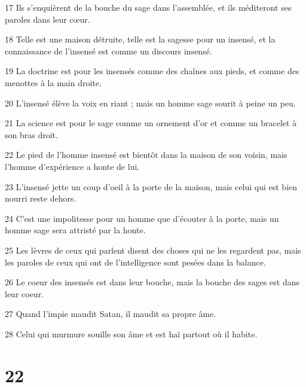 \par 17 Ils s'enquièrent de la bouche du sage dans l'assemblée, et ils méditeront ses paroles dans leur cœur.
\par 18 Telle est une maison détruite, telle est la sagesse pour un insensé, et la connaissance de l'insensé est comme un discours insensé.
\par 19 La doctrine est pour les insensés comme des chaînes aux pieds, et comme des menottes à la main droite.
\par 20 L'insensé élève la voix en riant ; mais un homme sage sourit à peine un peu.
\par 21 La science est pour le sage comme un ornement d'or et comme un bracelet à son bras droit.
\par 22 Le pied de l'homme insensé est bientôt dans la maison de son voisin, mais l'homme d'expérience a honte de lui.
\par 23 L'insensé jette un coup d'oeil à la porte de la maison, mais celui qui est bien nourri reste dehors.
\par 24 C'est une impolitesse pour un homme que d'écouter à la porte, mais un homme sage sera attristé par la honte.
\par 25 Les lèvres de ceux qui parlent disent des choses qui ne les regardent pas, mais les paroles de ceux qui ont de l'intelligence sont pesées dans la balance.
\par 26 Le coeur des insensés est dans leur bouche, mais la bouche des sages est dans leur coeur.
\par 27 Quand l'impie maudit Satan, il maudit sa propre âme.
\par 28 Celui qui murmure souille son âme et est haï partout où il habite.

\chapter{22}

